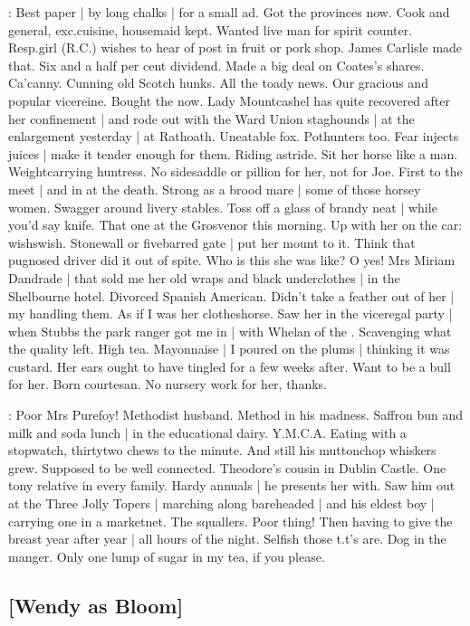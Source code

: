 \BloomInt:
Best paper |
by long chalks |
for a small ad.
Got the provinces now.
Cook and general,
exc.\@ cuisine,
housemaid kept.
Wanted live man for spirit counter.
Resp.\@ girl (R.C.\@) wishes to hear of post in fruit or pork shop.
James Carlisle made that.
Six and a half per cent dividend.
Made a big deal on Coates's shares.
Ca'canny.
Cunning old Scotch hunks.
All the toady news.
Our gracious and popular vicereine.
Bought the  now.
Lady Mountcashel has quite recovered after her confinement |
and rode out with the Ward Union staghounds |
at the enlargement yesterday |
at Rathoath.
Uneatable fox.
Pothunters too.
Fear injects juices |
make it tender enough for them.
Riding astride.
Sit her horse like a man.
Weightcarrying huntress.
No sidesaddle or pillion for her,
not for Joe.
First to the meet |
and in at the death.
Strong as a brood mare |
some of those horsey women.
Swagger around livery stables.
Toss off a glass of brandy neat |
while you'd say knife.
That one at the Grosvenor this morning.
Up with her on the car:
wishswish.
Stonewall or fivebarred gate |
put her mount to it.
Think that pugnosed driver did it out of spite.
Who is this she was like?
O yes!
Mrs Miriam Dandrade |
that sold me
her old wraps and black underclothes |
in the Shelbourne hotel.
Divorced Spanish American.
Didn't take a feather out of her |
my handling them.
As if I was her clotheshorse.
Saw her in the viceregal party |
when Stubbs the park ranger got me in |
with Whelan of the .
Scavenging what the quality left.
High tea.
Mayonnaise |
I poured on the plums |
thinking it was custard.
Her ears ought to have tingled for a few weeks after.
Want to be a bull for her.
Born courtesan.
No nursery work for her,
thanks.

\BloomInt:
Poor Mrs Purefoy!
Methodist husband.
Method in his madness.
Saffron bun and milk and soda lunch |
in the educational dairy.
Y.M.C.A\@.
Eating with a stopwatch,
thirtytwo chews to the minute.
And still his muttonchop whiskers grew.
Supposed to be well connected.
Theodore's cousin in Dublin Castle.
One tony relative in every family.
Hardy annuals |
he presents her with.
Saw him out at the Three Jolly Topers |
marching along bareheaded |
and his eldest boy |
carrying one in a marketnet.
The squallers.
Poor thing!
Then having to give the breast year after year |
all hours of the night.
Selfish those t.t's are.
Dog in the manger.
Only one lump of sugar in my tea,
if you please.

\subsection{[Wendy as Bloom]}

